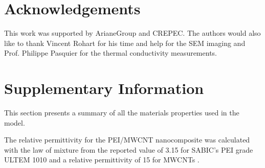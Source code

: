 \section{Acknowledgements}

This work was supported by ArianeGroup and CREPEC. 
The authors would also like to thank Vincent Rohart for his time and help for the SEM imaging and Prof. Philippe Pasquier for the thermal conductivity measurements. 

\section{Supplementary Information}

This section presents a summary of all the materials properties used in the model. 

The relative permittivity for the PEI/MWCNT nanocomposite was calculated with the law of mixture from the reported value of 3.15 for SABIC’s PEI grade ULTEM 1010 and a relative permittivity of 15 for MWCNTs \cite{Katsounaros2011}. 

